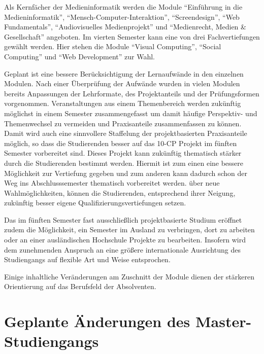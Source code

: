 Als Kernfächer der Medieninformatik werden die Module ``Einführung in
die Medieninformatik'', ``Mensch-Computer-Interaktion'',
``Screendesign'', ``Web Fundamentals'', ``Audiovisuelles Medienprojekt''
und ``Medienrecht, Medien \& Gesellschaft'' angeboten. Im vierten
Semester kann eine von drei Fachvertiefungen gewählt werden. Hier stehen
die Module ``Visual Computing'', ``Social Computing'' und ``Web
Development'' zur Wahl.

Geplant ist eine bessere Berücksichtigung der Lernaufwände in den
einzelnen Modulen. Nach einer Überprüfung der Aufwände wurden in vielen
Modulen bereits Anpassungen der Lehrformate, des Projektanteils und der
Prüfungsformen vorgenommen. Veranstaltungen aus einem Themenbereich
werden zukünftig möglichst in einem Semester zusammengefasst um damit
häufige Perspektiv- und Themenwechsel zu vermeiden und Praxisanteile
zusammenfassen zu können. Damit wird auch eine sinnvollere Staffelung
der projektbasierten Praxisanteile möglich, so dass die Studierenden
besser auf das 10-CP Projekt im fünften Semester vorbereitet sind.
Dieses Projekt kann zukünftig thematisch stärker durch die Studierenden
bestimmt werden. Hiermit ist zum einen eine bessere Möglichkeit zur
Vertiefung gegeben und zum anderen kann dadurch schon der Weg ins
Abschlusssemester thematisch vorbereitet werden. über neue
Wahlmöglichkeiten, können die Studierenden, entsprechend ihrer Neigung,
zukünftig besser eigene Qualifizierungsvertiefungen setzen.

Das im fünften Semester fast ausschließlich projektbasierte Studium
eröffnet zudem die Möglichkeit, ein Semester im Ausland zu verbringen,
dort zu arbeiten oder an einer ausländischen Hochschule Projekte zu
bearbeiten. Insofern wird dem zunehmenden Anspruch an eine größere
internationale Ausrichtung des Studiengangs auf flexible Art und Weise
entsprochen.

Einige inhaltliche Veränderungen am Zuschnitt der Module dienen der
stärkeren Orientierung auf das Berufsfeld der Absolventen.

\section{Geplante Änderungen des
Master-Studiengangs}\label{geplante-uxe4nderungen-des-master-studiengangs}

